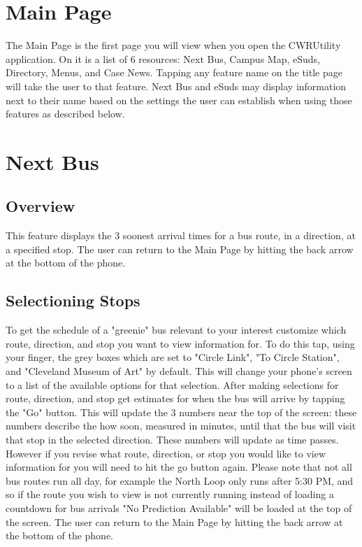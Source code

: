 \documentclass[pdftex,12pt,letter]{article}
\begin{document}
\section{Main Page}
The Main Page is the first page you will view when you open the CWRUtility application. On it is a list of 6 resources: Next Bus, Campus Map, eSuds, Directory, Menus, and Case News. Tapping any feature name on the title page will take the user to that feature. Next Bus and eSuds may display information next to their name based on the settings the user can establish when using those features as described below. 

\section{Next Bus}
\subsection{Overview}
This feature displays the 3 soonest arrival times for a bus route, in a direction, at a specified stop. The user can return to the Main Page by hitting the back arrow at the bottom of the phone.
\subsection{Selectioning Stops}
To get the schedule of a "greenie" bus relevant to your interest customize which route, direction, and stop you want to view information for. To do this tap, using your finger, the grey boxes which are set to "Circle Link", "To Circle Station", and "Cleveland Museum of Art" by default. This will change your phone's screen to a list of the available options for that selection. After making selections for route, direction, and stop get estimates for when the bus will arrive by tapping the "Go" button. This will update the 3 numbers near the top of the screen: these numbers describe the how soon, measured in minutes, until that the bus will visit that stop in the selected direction. These numbers will update as time passes. However if you revise what route, direction, or stop you would like to view information for you will need to hit the go button again. Please note that not all bus routes run all day, for example the North Loop only runs after 5:30 PM, and so if the route you wish to view is not currently running instead of loading a countdown for bus arrivals "No Prediction Available" will be loaded at the top of the screen. The user can return to the Main Page by hitting the back arrow at the bottom of the phone.
\end{document}
